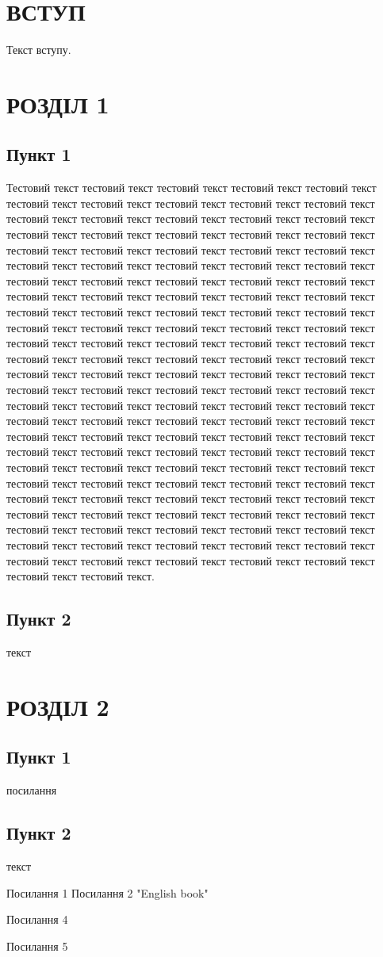 \documentclass[14pt]{extarticle}
\newcommand{\issectionnumbered}{1}
\newcommand{\unnumberedsection}[1]{
\renewcommand{\issectionnumbered}{0}
\section*{#1}
\addcontentsline{toc}{section}{#1}
\renewcommand{\issectionnumbered}{1}
}
\begin{document}
\tableofcontents

\newpage

\unnumberedsection{ВСТУП}

Текст вступу.

\section{РОЗДІЛ 1}
\subsection{Пункт 1}
Тестовий текст тестовий текст тестовий текст тестовий текст тестовий текст тестовий текст тестовий текст тестовий текст тестовий текст тестовий текст тестовий текст тестовий текст тестовий текст тестовий текст тестовий текст тестовий текст тестовий текст тестовий текст тестовий текст тестовий текст тестовий текст тестовий текст тестовий текст тестовий текст тестовий текст тестовий текст тестовий текст тестовий текст тестовий текст тестовий текст тестовий текст тестовий текст тестовий текст тестовий текст тестовий текст тестовий текст тестовий текст тестовий текст тестовий текст тестовий текст тестовий текст тестовий текст тестовий текст тестовий текст тестовий текст тестовий текст тестовий текст тестовий текст тестовий текст тестовий текст тестовий текст тестовий текст тестовий текст тестовий текст тестовий текст тестовий текст тестовий текст тестовий текст тестовий текст тестовий текст тестовий текст тестовий текст тестовий текст тестовий текст тестовий текст тестовий текст тестовий текст тестовий текст тестовий текст тестовий текст тестовий текст тестовий текст тестовий текст тестовий текст тестовий текст тестовий текст тестовий текст тестовий текст тестовий текст тестовий текст тестовий текст тестовий текст тестовий текст тестовий текст тестовий текст тестовий текст тестовий текст тестовий текст тестовий текст тестовий текст тестовий текст тестовий текст тестовий текст тестовий текст тестовий текст тестовий текст тестовий текст тестовий текст тестовий текст тестовий текст тестовий текст тестовий текст тестовий текст тестовий текст тестовий текст тестовий текст тестовий текст тестовий текст тестовий текст тестовий текст тестовий текст тестовий текст тестовий текст тестовий текст тестовий текст тестовий текст тестовий текст тестовий текст тестовий текст тестовий текст тестовий текст тестовий текст тестовий текст тестовий текст тестовий текст тестовий текст тестовий текст.
\subsection{Пункт 2}
текст
\section{РОЗДІЛ 2}
\subsection{Пункт 1}
посилання \cite{bib1,bib3,bib4,bib5}
\subsection{Пункт 2}
текст

\begin{thebibliography}{9}
Посилання 1
Посилання 2
"English book"

Посилання 4

Посилання 5

\end{thebibliography}
\end{document}

